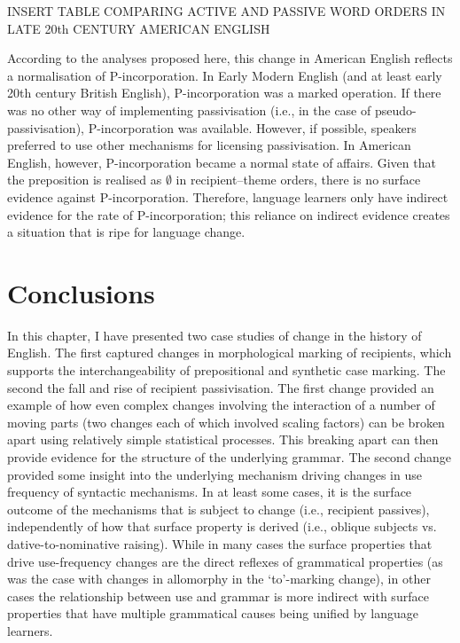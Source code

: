 	INSERT TABLE COMPARING ACTIVE AND PASSIVE WORD ORDERS IN LATE 20th CENTURY AMERICAN ENGLISH

	According to the analyses proposed here, this change in American English reflects a normalisation of P-incorporation. In Early Modern English (and at least early 20th century British English), P-incorporation was a marked operation. If there was no other way of implementing passivisation (i.e., in the case of pseudo-passivisation), P-incorporation was available. However, if possible, speakers preferred to use other mechanisms for licensing passivisation. In American English, however, P-incorporation became a normal state of affairs. Given that the preposition is realised as $\emptyset$ in recipient--theme orders, there is no surface evidence against P-incorporation. Therefore, language learners only have indirect evidence for the rate of P-incorporation; this reliance on indirect evidence creates a situation that is ripe for language change.

\section{Conclusions}
	In this chapter, I have presented two case studies of change in the history of English. The first captured changes in morphological marking of recipients, which supports the interchangeability of prepositional and synthetic case marking. The second the fall and rise of recipient passivisation. The first change provided an example of how even complex changes involving the interaction of a number of moving parts (two changes each of which involved scaling factors) can be broken apart using relatively simple statistical processes. This breaking apart can then provide evidence for the structure of the underlying grammar. The second change provided some insight into the underlying mechanism driving changes in use frequency of syntactic mechanisms. In at least some cases, it is the surface outcome of the mechanisms that is subject to change (i.e., recipient passives), independently of how that surface property is derived (i.e., oblique subjects vs. dative-to-nominative raising). While in many cases the surface properties that drive use-frequency changes are the direct reflexes of grammatical properties (as was the case with changes in allomorphy in the `to'-marking change), in other cases the relationship between use and grammar is more indirect with surface properties that have multiple grammatical causes being unified by language learners.

%
